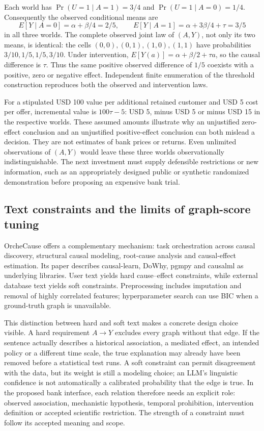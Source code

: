 Each world has $\Pr(U=1\mid A=1)=3/4$ and
$\Pr(U=1\mid A=0)=1/4$. Consequently the observed conditional means are
\begin{equation}
 E[Y\mid A=0]=\alpha+\beta/4=2/5,\qquad
 E[Y\mid A=1]=\alpha+3\beta/4+\tau=3/5
 \label{exec17:frontier-observed}
\end{equation}
in all three worlds. The complete observed joint law of $(A,Y)$, not only
its two means, is identical: the cells $(0,0),(0,1),(1,0),(1,1)$ have
probabilities $3/10,1/5,1/5,3/10$. Under intervention,
$E[Y(a)]=\alpha+\beta/2+\tau a$, so the causal difference is $\tau$.
Thus the same positive observed difference of $1/5$ coexists with a
positive, zero or negative effect. Independent finite enumeration of the
threshold construction reproduces both the observed and intervention laws.
\citep{exec17_frontier_exact}

For a stipulated USD 100 value per additional retained customer and USD 5
cost per offer, incremental value is $100\tau-5$: USD 5, minus USD 5 or
minus USD 15 in the respective worlds. These assumed amounts illustrate why
an unjustified zero-effect conclusion and an unjustified positive-effect
conclusion can both mislead a decision. They are not estimates of bank prices
or returns. Even unlimited observations of $(A,Y)$ would leave these three
worlds observationally indistinguishable. The next investment must supply
defensible restrictions or new information, such as an appropriately designed
public or synthetic randomized demonstration before proposing an expensive
bank trial.\citep{exec17_frontier_exact}

\subsection{Text constraints and the limits of graph-score tuning}

OrcheCause offers a complementary mechanism: task orchestration across causal
discovery, structural causal modeling, root-cause analysis and causal-effect
estimation. Its paper describes causal-learn, DoWhy, pgmpy and causalml as
underlying libraries. User text yields hard cause--effect constraints, while
external database text yields soft constraints. Preprocessing includes
imputation and removal of highly correlated features; hyperparameter search
can use BIC when a ground-truth graph is unavailable.
\citep{exec17_frontier_yang}

This distinction between hard and soft text makes a concrete design choice
visible. A hard requirement $A\to Y$ excludes every graph without that edge.
If the sentence actually describes a historical association, a mediated
effect, an intended policy or a different time scale, the true explanation
may already have been removed before a statistical test runs. A soft
constraint can permit disagreement with the data, but its weight is still
a modeling choice; an LLM's linguistic confidence is not automatically a
calibrated probability that the edge is true. In the proposed bank interface,
each relation therefore needs an explicit role: observed association,
mechanistic hypothesis, temporal prohibition, intervention definition or
accepted scientific restriction. The strength of a constraint must follow
its accepted meaning and scope.

